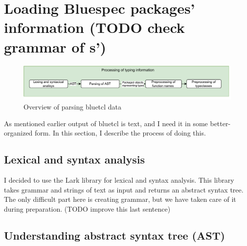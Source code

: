 \documentclass[12pt]{report}
\begin{document}
\section{Loading Bluespec packages' information (TODO check grammar of s')}  

\begin{figure}[!h]  
   \centering  
   \caption{Overview of parsing bluetcl data}  
   \includegraphics[width=1.0\columnwidth]{pdfExports/LargeMapProcessing.pdf}  
\end{figure}  

As mentioned earlier output of bluetcl is text, and I need it in some better-organized form. In this section, I describe the process of doing this.  
\subsection{Lexical and syntax analysis}  
I decided to use the Lark library for lexical and syntax analysis. This library takes grammar and strings of text as input and returns an abstract syntax tree. The only difficult part here is creating grammar, but we have taken care of it during preparation. (TODO improve this last sentence)  
\subsection{Understanding abstract syntax tree (AST)}  
\end{document}
